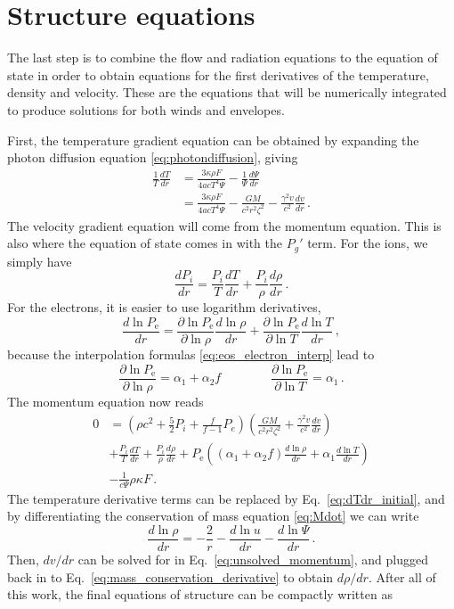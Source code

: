 \documentclass[../main.tex]{subfiles}
\begin{document}
\section{Structure equations}\label{eq:structure_eqs}
The last step is to combine the flow and radiation equations to the equation of state in order to obtain equations for the first derivatives of the temperature, density and velocity. These are the equations that will be numerically integrated to produce solutions for both winds and envelopes. 

First, the temperature gradient equation can be obtained by expanding the photon diffusion equation \eqref{eq:photondiffusion}, giving
\begin{align}
    \frac{1}{T}\frac{dT}{dr}&=\frac{3\kappa\rho F}{4acT^4\Psi}-\frac{1}{\Psi}\frac{d\Psi}{dr}\nonumber\\
    &=\frac{3\kappa\rho F}{4acT^4\Psi}-\frac{GM}{c^2r^2\zeta^2}-\frac{\gamma^2v}{c^2}\frac{dv}{dr}\label{eq:dTdr_initial} \,.
\end{align}
The velocity gradient equation will come from the momentum equation. This is also where the equation of state comes in with the $P_g'$ term. For the ions, we simply have
\begin{equation}
    \frac{dP_i}{dr}=\frac{P_i}{T}\frac{dT}{dr}+\frac{P_i}{\rho}\frac{d\rho}{dr}\,.
\end{equation}
For the electrons, it is easier to use logarithm derivatives,
\begin{equation}
    \frac{d\ln P_\text{e}}{dr}=\frac{\partial \ln P_\text{e}}{\partial\ln\rho}\frac{d\ln\rho}{dr} + \frac{\partial \ln P_\text{e}}{\partial\ln T}\frac{d\ln T}{dr}\,,
\end{equation}
because the interpolation formulas \eqref{eq:eos_electron_interp} lead to
\begin{equation}
    \frac{\partial \ln P_\text{e}}{\partial\ln\rho} = \alpha_1+\alpha_2 f \qquad\qquad
    \frac{\partial \ln P_\text{e}}{\partial\ln T}=\alpha_1\,.
\end{equation}
The momentum equation now reads
\begin{align}
     0 &= \left(\rho c^2+\frac{5}{2}P_i+\frac{f}{f-1}P_e\right)\left(\frac{GM}{c^2r^2\zeta^2}+\frac{\gamma^2v}{c^2}\frac{dv}{dr}\right) \nonumber\\
     & + \frac{P_i}{T}\frac{dT}{dr}+\frac{P_i}{\rho}\frac{d\rho}{dr} + P_\text{e}\left((\alpha_1+\alpha_2f)\frac{d\ln\rho}{dr}+\alpha_1\frac{d\ln T}{dr}\right) \nonumber\\
     & - \frac{1}{c\Psi}\rho\kappa F\,.  \label{eq:unsolved_momentum}
\end{align}
The temperature derivative terms can be replaced by Eq.~\eqref{eq:dTdr_initial}, and by differentiating the conservation of mass equation \eqref{eq:Mdot} we can write
\begin{equation}\label{eq:mass_conservation_derivative}
    \frac{d\ln\rho}{dr}=-\frac{2}{r}-\frac{d\ln u}{dr}-\frac{d\ln\Psi}{dr}\,.
\end{equation}
Then, $dv/dr$ can be solved for in Eq.~\eqref{eq:unsolved_momentum}, and plugged back in to Eq.~\eqref{eq:mass_conservation_derivative} to obtain $d\rho/dr$. After all of this work, the final equations of structure can be compactly written as
\end{document}
